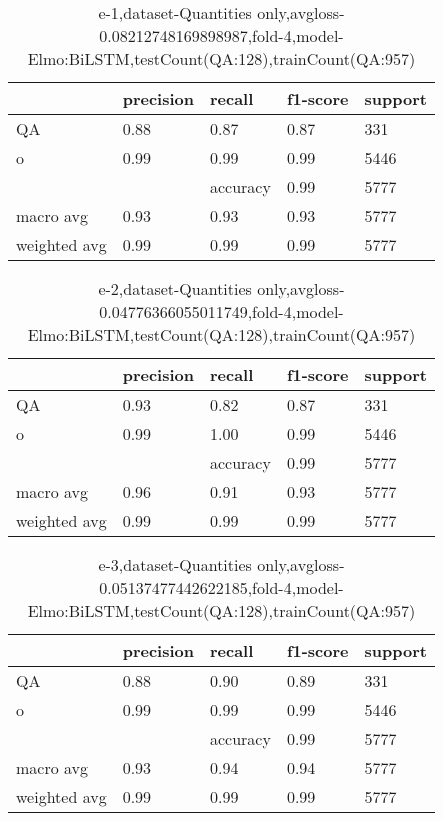 \begin{table}[!ht] 
\centering
\caption{e-1,dataset-Quantities only,avgloss-0.08212748169898987,fold-4,model-Elmo:BiLSTM,testCount(QA:128),trainCount(QA:957)}\label{e-1data-quantS.tsv}
\begin{tabularx}{300pt}{|X|X|X|X|X|}
\hline
&precision&recall&f1-score&support\\
\hline
QA&0.88&0.87&0.87&331\\
\hline
o&0.99&0.99&0.99&5446\\
\hline
&&accuracy&0.99&5777\\
\hline
macro avg&0.93&0.93&0.93&5777\\
\hline
weighted avg&0.99&0.99&0.99&5777\\
\hline
\end{tabularx}
\end{table}
\begin{table}[!ht] 
\centering
\caption{e-2,dataset-Quantities only,avgloss-0.04776366055011749,fold-4,model-Elmo:BiLSTM,testCount(QA:128),trainCount(QA:957)}\label{e-2data-quantS.tsv}
\begin{tabularx}{300pt}{|X|X|X|X|X|}
\hline
&precision&recall&f1-score&support\\
\hline
QA&0.93&0.82&0.87&331\\
\hline
o&0.99&1.00&0.99&5446\\
\hline
&&accuracy&0.99&5777\\
\hline
macro avg&0.96&0.91&0.93&5777\\
\hline
weighted avg&0.99&0.99&0.99&5777\\
\hline
\end{tabularx}
\end{table}
\begin{table}[!ht] 
\centering
\caption{e-3,dataset-Quantities only,avgloss-0.05137477442622185,fold-4,model-Elmo:BiLSTM,testCount(QA:128),trainCount(QA:957)}\label{e-3data-quantS.tsv}
\begin{tabularx}{300pt}{|X|X|X|X|X|}
\hline
&precision&recall&f1-score&support\\
\hline
QA&0.88&0.90&0.89&331\\
\hline
o&0.99&0.99&0.99&5446\\
\hline
&&accuracy&0.99&5777\\
\hline
macro avg&0.93&0.94&0.94&5777\\
\hline
weighted avg&0.99&0.99&0.99&5777\\
\hline
\end{tabularx}
\end{table}
